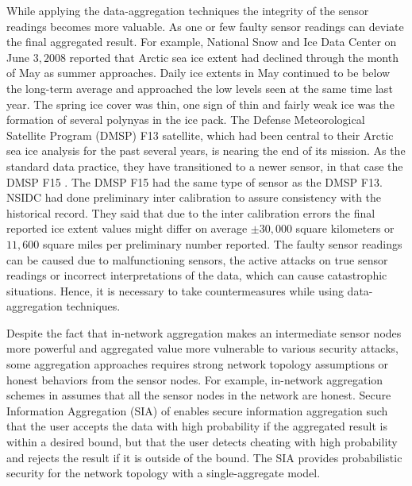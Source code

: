 	While applying the data-aggregation techniques the integrity of the sensor readings becomes more valuable.
	As one or few faulty sensor readings can deviate the final aggregated result.
	For example,
	National Snow and Ice Data Center on June $3, 2008$ \cite{nsidc} reported that Arctic sea ice extent had declined through the month of May as summer approaches. 
	Daily ice extents in May continued to be below the long-term average and approached the low levels seen at the same time last year.
	The spring ice cover was thin, one sign of thin and fairly weak ice was the formation of several polynyas in the ice pack.
	The Defense Meteorological Satellite Program (DMSP) F13 \cite{dmsp-f13} satellite, which had been central to their Arctic sea ice analysis for the past several years, is nearing the end of its mission.
	As the standard data practice, they have transitioned to a newer sensor, in that case the DMSP F15 \cite{dmsp-f15}. 
	The DMSP F15 had the same type of sensor as the DMSP F13. 
	NSIDC had done preliminary inter calibration to assure consistency with the historical record. 
	They said that due to the inter calibration errors the final reported ice extent values might differ on average $\pm 30,000$ square kilometers or $11,600$ square miles per preliminary number reported.
	The faulty sensor readings can be caused due to malfunctioning sensors, the active attacks on true sensor readings or incorrect interpretations of the data, which can cause catastrophic situations.
	Hence, it is necessary to take countermeasures while using data-aggregation techniques.

	Despite the fact that in-network aggregation makes an intermediate sensor nodes more powerful and aggregated value more vulnerable to various security attacks, some aggregation approaches requires strong network topology assumptions or honest behaviors from the sensor nodes.
	For example, in-network aggregation schemes in \cite{yao2002cougar, madden2003design} assumes that all the sensor nodes in the network are honest. 
	Secure Information Aggregation (SIA) of \cite{przydatek2003sia} enables secure information aggregation such that the user accepts the data with high probability if the aggregated result is within a desired bound, but that the user detects cheating with high probability and rejects the result if it is outside of the bound.
	The SIA provides probabilistic security for the network topology with a single-aggregate model.

